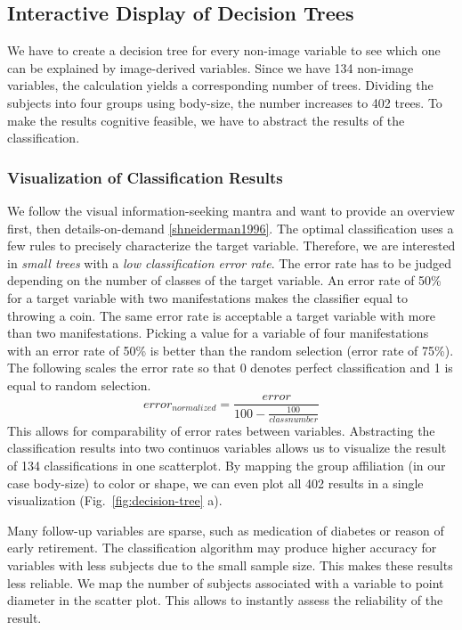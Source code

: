 \documentclass[a4paper,twoside]{style/article}
\begin{document}
\subsection{Interactive Display of Decision Trees}
We have to create a decision tree for every non-image variable to see which one can be explained by image-derived variables.
Since we have 134 non-image variables, the calculation yields a corresponding number of trees.
Dividing the subjects into four groups using body-size, the number increases to 402 trees.
To make the results cognitive feasible, we have to abstract the results of the classification.
\subsubsection{Visualization of Classification Results}
We follow the visual information-seeking mantra and want to provide an overview first, then details-on-demand \ref{shneiderman1996}.
The optimal classification uses a few rules to precisely characterize the target variable.
Therefore, we are interested in \emph{small trees} with a \emph{low classification error rate}.
The error rate has to be judged depending on the number of classes of the target variable.
An error rate of 50\% for a target variable with two manifestations makes the classifier equal to throwing a coin.
The same error rate is acceptable a target variable with more than two manifestations.
Picking a value for a variable of four manifestations with an error rate of 50\% is better than the random selection (error rate of 75\%).
The following scales the error rate so that 0 denotes perfect classification and 1 is equal to random selection.
\begin{equation}
error_{normalized} = \frac{error}{100 - \frac{100}{class number}}
\end{equation}
This allows for comparability of error rates between variables.
Abstracting the classification results into two continuos variables allows us to visualize the result of 134 classifications in one scatterplot.
By mapping the group affiliation (in our case body-size) to color or shape, we can even plot all 402 results in a single visualization (Fig.~\ref{fig:decision-tree} a).

Many follow-up variables are sparse, such as medication of diabetes or reason of early retirement.
The classification algorithm may produce higher accuracy for variables with less subjects due to the small sample size.
This makes these results less reliable.
We map the number of subjects associated with a variable to point diameter in the scatter plot.
This allows to instantly assess the reliability of the result.
\end{document}
